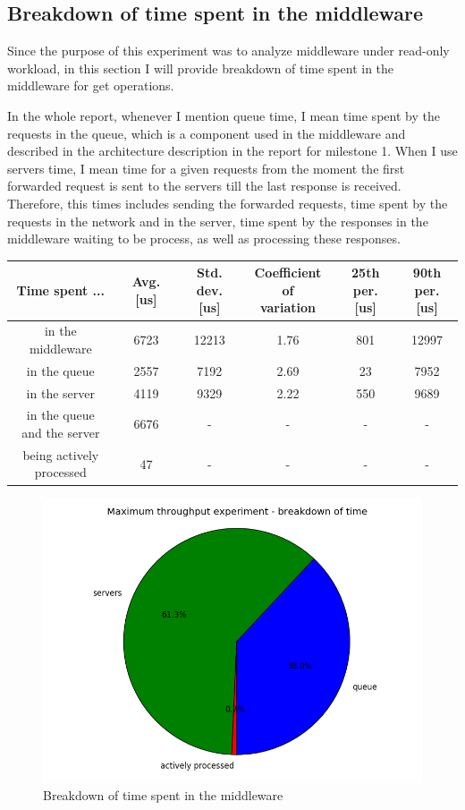 \documentclass[11pt]{article}
\begin{document}
\subsection{Breakdown of time spent in the middleware}
\label{sec:time-breakdown}

Since the purpose of this experiment was to analyze middleware under read-only workload, in this section I will provide breakdown of time spent in the middleware for get operations.
\medskip

In the whole report, whenever I mention queue time, I mean time spent by the requests in the queue, which is a component used in the middleware and described in the architecture description in the report for milestone 1. When I use servers time, I mean time for a given requests from the moment the first forwarded request is sent to the servers till the last response is received. Therefore, this times includes sending the forwarded requests, time spent by the requests in the network and in the server, time spent by the responses in the middleware waiting to be process, as well as processing these responses. 

\begin{tabular}{|c|c|c|c|c|c|}
\hline \bf{Time spent ...} & \bf{Avg. [us]} & \parbox[t]{2.0cm}{\bf{Std.\\dev. [us]}} & \parbox[t]{2.5cm}{\bf{Coefficient of \\variation}} & \parbox[t]{1.7cm}{\bf{25th \\per. [us]}} & \parbox[t]{1.7cm}{\bf{90th \\per. [us]}} \\[3ex]
\hline in the middleware & 6723 & 12213 & 1.76 & 801 & 12997 \\
\hline in the queue & 2557 & 7192 & 2.69 & 23 & 7952\\
\hline in the server & 4119 & 9329 & 2.22 & 550 & 9689\\
\hline \parbox[t]{3cm}{in the queue\\and the server} & 6676 & - & - & -&-\\[3ex]
\hline \parbox[t]{3cm}{being actively\\processed} & 47 & - & - & -&-\\
\hline
\end{tabular}
\medskip

\begin{figure}
\centering
\includegraphics[width=0.5\linewidth]{plots/max_throughput-breakdown}
\caption{Breakdown of time spent in the middleware}
\label{fig:max-throughput-breakdown}
\end{figure}
\end{document}
